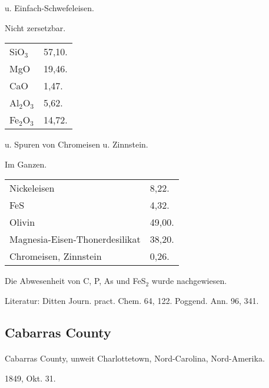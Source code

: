 \documentclass[a4paper, 11pt, oneside]{article}
\begin{document}
u. Einfach-Schwefeleisen.

\begin{center}
Nicht zersetzbar.
\end{center}

\begin{table}[H]
    \centering
    \begin{tabular}{l l}
        SiO$_{3}$ & 57,10. \\
        MgO & 19,46. \\
        CaO & 1,47. \\
        Al$_{2}$O$_{3}$ & 5,62. \\
        Fe$_{2}$O$_{3}$ & 14,72. \\
    \end{tabular}
\end{table}

u. Spuren von Chromeisen u. Zinnstein.

\begin{center}
Im Ganzen.
\end{center}

\begin{table}[H]
    \centering
    \begin{tabular}{l l}
        Nickeleisen & 8,22. \\
        FeS & 4,32. \\
        Olivin & 49,00. \\
        Magnesia-Eisen-Thonerdesilikat & 38,20. \\
        Chromeisen, Zinnstein & 0,26. \\
    \end{tabular}
\end{table}

Die Abwesenheit von C, P, As und FeS$_{2}$ wurde nachgewiesen.

\footnotesize
Literatur: Ditten Journ. pract. Chem. 64, 122. Poggend. Ann. 96, 341.

\subsection{Cabarras County}
\normalsize
\paragraph{}
Cabarras County, unweit Charlottetown, Nord-Carolina, Nord-Amerika.

1849, Okt. 31.
\end{document}
